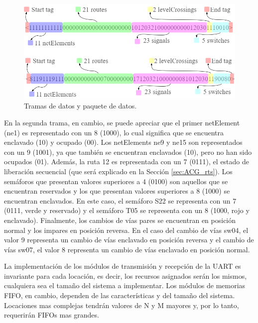 	\begin{figure}[H]
		\centering
		\includegraphics[width=1\textwidth]{Figuras/Trama_ejemplo.png}
		\centering\caption{Tramas de datos y paquete de datos.}
		\label{fig:Stream_ejemplo1}
	\end{figure}

	En la segunda trama, en cambio, se puede apreciar que el primer netElement (ne1) es representado con un 8 (1000), lo cual significa que se encuentra enclavado (10) y ocupado (00). Los netElements ne9 y ne15 son representados con un 9 (1001), ya que también se encuentran enclavados (10), pero no han sido ocupados (01). Además, la ruta 12 es representada con un 7 (0111), el estado de liberación secuencial (que será explicado en la Sección \ref{sec:ACG_rts}). Los semáforos que presentan valores superiores a 4 (0100) son aquellos que se encuentran reservados y los que presentan valores superiores a 8 (1000) se encuentran enclavados. En este caso, el semáforo S22 se representa con un 7 (0111, verde y reservado) y el semáforo T05 se representa con un 8 (1000, rojo y enclavado). Finalmente, los cambios de vías pares se encuentran en posición normal y los impares en posición reversa. En el caso del cambio de vías sw04, el valor 9 representa un cambio de vías enclavado en posición reversa y el cambio de vías sw07, el valor 8 representa un cambio de vías enclavado en posición normal.
	
	La implementación de los módulos de transmisión y recepción de la UART es invariante para cada locación, es decir, los recursos asignados serán los mismos, cualquiera sea el tamaño del sistema a implementar. Los módulos de memorias FIFO, en cambio, dependen de las características y del tamaño del sistema. Locaciones mas complejas tendrán valores de N y M mayores y, por lo tanto, requerirán FIFOs mas grandes. 
	
	
	
	
	

